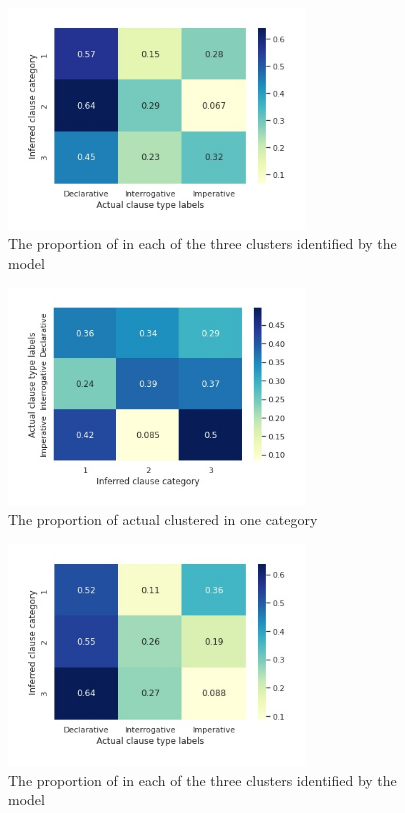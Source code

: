 \begin{figure}[H]
    \centering
    \includegraphics[width=0.7\textwidth]{figures/man-baseline-conservative-heat.jpg}
    \caption{The proportion of \diis{} in each of the three clusters identified by the \dlearnerabbr{} model}
    \label{fig:man-baseline-conservative-heat}
\end{figure}


\begin{figure}[H]
    \centering
    \includegraphics[width=0.7\textwidth]{figures/man-baseline-conservative-heatrev.jpg}
    \caption{The proportion of actual \diis{} clustered in one category}
    \label{fig:man-baseline-conservative-heatrev}
\end{figure}

\begin{figure}[H]
    \centering
    \includegraphics[width=0.7\textwidth]{figures/man-baseline-mid-heat.jpg}
    \caption{The proportion of \diis{} in each of the three clusters identified by the \dlearnerabbr{} model}
    \label{fig:man-baseline-mid-heat}
\end{figure}


